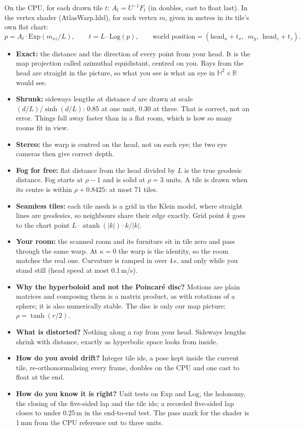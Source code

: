 \documentclass[10pt]{article}
\newcommand{\Sub}[1]{\Needspace{18mm}\vspace{2.5mm}\noindent{\bfseries\color{accD}#1}\par\vspace{0.3mm}}
\newenvironment{asked}{\Needspace{16mm}\par\vspace{2mm}\noindent{\small\bfseries\color{accC}If asked}%
  \begin{itemize}[leftmargin=4.5mm,itemsep=1.5pt,topsep=1pt]\small}{\end{itemize}}
\newcommand{\Q}[1]{\item \textbf{#1}}
\newcommand{\code}[1]{{\ttfamily\fontsize{8.8}{11}\selectfont #1}}
\newcommand{\R}{\mathbb{R}}
\newcommand{\Hyp}{\mathbb{H}^2}
\begin{document}
\Sub{Draw out: the warp}

On the CPU, for each drawn tile $t$: $A_t=U^{-1}F_t$ (in doubles, cast to float last). In the vertex shader (\code{AtlasWarp.hlsl}), for each vertex $m$, given in metres in its tile's own flat chart:
\[
p=A_t\cdot\mathrm{Exp}(m_{xz}/L),\qquad t=L\cdot\mathrm{Log}(p),\qquad
\text{world position}=(\text{head}_x+t_x,\ \ m_y,\ \ \text{head}_z+t_z).
\]
\begin{itemize}
\item \textbf{Exact:} the distance and the direction of every point from your head. It is the map projection called azimuthal equidistant, centred on you. Rays from the head are straight in the picture, so what you see is what an eye in $\Hyp\times\R$ would see.
\item \textbf{Shrunk:} sideways lengths at distance $d$ are drawn at scale $(d/L)/\sinh(d/L)$: 0.85 at one unit, 0.30 at three. That is correct, not an error. Things fall away faster than in a flat room, which is how so many rooms fit in view.
\item \textbf{Stereo:} the warp is centred on the head, not on each eye; the two eye cameras then give correct depth.
\item \textbf{Fog for free:} flat distance from the head divided by $L$ is the true geodesic distance. Fog starts at $\rho-1$ and is solid at $\rho=3$ units. A tile is drawn when its centre is within $\rho+0.8425$: at most 71 tiles.
\item \textbf{Seamless tiles:} each tile mesh is a grid in the Klein model, where straight lines are geodesics, so neighbours share their edge exactly. Grid point $k$ goes to the chart point $L\cdot\operatorname{atanh}(|k|)\cdot k/|k|$.
\item \textbf{Your room:} the scanned room and its furniture sit in tile zero and pass through the same warp. At $\kappa=0$ the warp is the identity, so the room matches the real one. Curvature is ramped in over 4\,s, and only while you stand still (head speed at most 0.1\,m/s).
\end{itemize}

\begin{asked}
\Q{Why the hyperboloid and not the Poincar\'e disc?} Motions are plain matrices and composing them is a matrix product, as with rotations of a sphere; it is also numerically stable. The disc is only our map picture: $\rho=\tanh(r/2)$.
\Q{What is distorted?} Nothing along a ray from your head. Sideways lengths shrink with distance, exactly as hyperbolic space looks from inside.
\Q{How do you avoid drift?} Integer tile ids, a pose kept inside the current tile, re-orthonormalising every frame, doubles on the CPU and one cast to float at the end.
\Q{How do you know it is right?} Unit tests on Exp and Log, the holonomy, the closing of the five-sided lap and the tile ids; a recorded five-sided lap closes to under 0.25\,m in the end-to-end test. The pass mark for the shader is 1\,mm from the CPU reference out to three units.
\end{asked}
\end{document}

